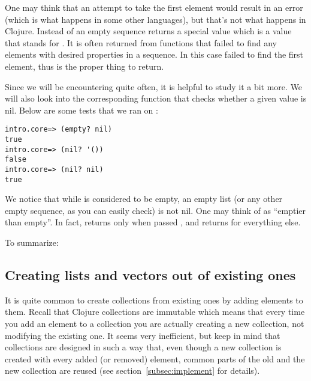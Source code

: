 One may think that an attempt to take the first element would result in an error (which is what happens in some other languages), but that's not what happens in Clojure. Instead  of an empty sequence returns a special value  which is a value that stands for . It is often returned from functions that failed to find any elements with desired properties in a sequence. In this case  failed to find the first element, thus  is the proper thing to return. 

Since we will be encountering  quite often, it is helpful to study it a bit more. We will also look into the corresponding function  that checks whether a given value is nil. Below are some tests that we ran on  :
\begin{framed}
\begin{verbatim}
intro.core=> (empty? nil)
true
intro.core=> (nil? '())
false
intro.core=> (nil? nil)
true
\end{verbatim}
\end{framed}
We notice that while  is considered to be empty, an empty list (or any other empty sequence, as you can easily check) is not nil. One may think of   as ``emptier than empty''. In fact,  returns  only when passed , and returns  for everything else. 

To summarize: 

\subsection{Creating lists and vectors out of existing ones}\label{subsec:conj-lists-vectors}
It is quite common to create collections from existing ones by adding elements to them. Recall that Clojure collections are immutable which means that every time you add an element to a collection  you are actually creating a new collection, not modifying the existing one. %
It seems very inefficient, but keep in mind that collections are designed in such a way that, even though a new collection is created with every added (or removed) element, common parts of the old and the new collection are reused (see section~\ref{subsec:implement} for details).  

